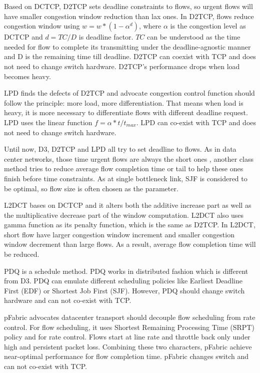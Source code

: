 \documentclass[10pt, conference, letterpaper]{IEEEtran}
\begin{document}
Based on DCTCP, D2TCP \cite{D2TCP} sets deadline constraints to flows, so urgent flows will have smaller congestion window reduction than lax ones.
In D2TCP, flows reduce congestion window using $w=w*(1-\alpha^d)$, where $\alpha$ is the congestion level as DCTCP and $d=TC/D$ is deadline factor.
$TC$ can be understood as the time needed for flow to complete its transmitting under the deadline-agnostic manner and D is the remaining time till deadline. 
D2TCP can coexist with TCP and does not need to change switch hardware.
D2TCP's performance drops  when load becomes heavy. 

 LPD \cite{LPD} finds the defects of D2TCP and advocate congestion control function should follow the principle:
 more load, more differentiation. That means when load is heavy,  it is more necessary to differentiate flows with different deadline request.
 LPD uses the linear function $f=\alpha*t/t_{max}$. LPD can co-exist with TCP and does not need to change switch hardware. 
 

Until now, D3, D2TCP and LPD all try to set deadline to flows.
As in data center networks,  those time urgent flows are always the short ones , another class method tries to reduce average flow completion time or tail to help these ones finish before time constraints.
As at single bottleneck link, SJF is considered to be optimal, so flow size is often chosen as the parameter.




L2DCT \cite{L2DCT} bases on DCTCP and it alters both
the additive increase part as well as the multiplicative decrease part of the window computation.
L2DCT also uses gamma function as its penalty function, which is the same as D2TCP. 
In L2DCT, short flow have larger congestion window increment and smaller congestion window decrement than large flows.
As a result, average flow completion time will be reduced.



PDQ \cite{PDQ} is a schedule method. PDQ works in distributed fashion which is different from D3.
PDQ can  emulate different scheduling policies like Earliest Deadline First (EDF) or Shortest Job First (SJF).
However,  PDQ should change switch hardware and can not co-exist with TCP.

pFabric \cite{pFabric} advocates datacenter transport should decouple flow scheduling from rate control. 
For flow scheduling, it uses Shortest Remaining Processing Time (SRPT) policy and for rate control. Flows start at line rate and throttle back only under high and persistent packet loss.
Combining these two characters, pFabric achieve near-optimal performance for flow completion time. 
pFabric changes switch and can not co-exist with TCP.
\end{document}
